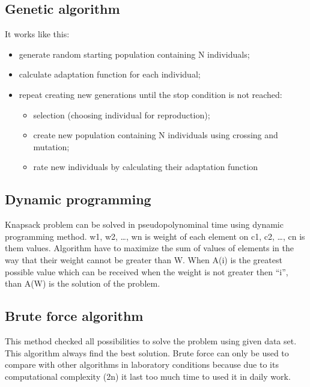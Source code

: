 \documentclass[conference,compsoc]{IEEEtran}
\begin{document}
\subsection{Genetic algorithm}
It works like this:
\begin{itemize}
\item generate random starting population containing N individuals;
\item calculate adaptation function for each individual;
\item repeat creating new generations until the stop condition is not reached:
	\begin{itemize}
	\item selection (choosing individual for reproduction);
	\item create new population containing N individuals 					using crossing and mutation;
	\item rate new individuals by calculating their 						adaptation function
	\end{itemize}
	

\end{itemize}
\subsection{Dynamic programming}
Knapsack problem can be solved in pseudopolynominal time using dynamic programming method. w1, w2, …, wn is weight of each element on c1, c2, …, cn is them values. Algorithm have to maximize the sum of values of elements in the way that their weight cannot be greater than W. When A(i) is the greatest possible value which can be received when the weight is not greater then “i”, than A(W) is the solution of the problem.

\subsection{Brute force algorithm}
This method checked all possibilities to solve the problem using given data set. This algorithm always find the best solution. Brute force can only be used to compare with other algorithms in laboratory conditions because due to its computational complexity (2n) it last too much time to used it in daily work. 
\end{document}
